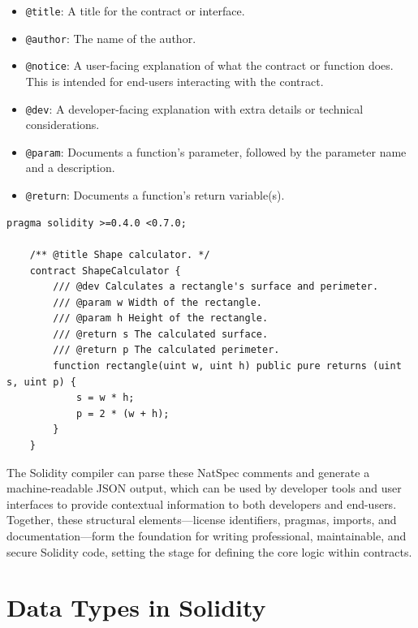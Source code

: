 \documentclass{scrbook}
\begin{document}
\begin{itemize}
    \item \texttt{@title}: A title for the contract or interface.
    
    \item \texttt{@author}: The name of the author.
    
    \item \texttt{@notice}: A user-facing explanation of what the contract or function does. This is intended for end-users interacting with the contract.
    
    \item \texttt{@dev}: A developer-facing explanation with extra details or technical considerations.
    
    \item \texttt{@param}: Documents a function's parameter, followed by the parameter name and a description.
    
    \item \texttt{@return}: Documents a function's return variable(s).
\end{itemize}

\begin{lstlisting}[caption={Example of function with comments}]
    pragma solidity >=0.4.0 <0.7.0;
    
    /** @title Shape calculator. */
    contract ShapeCalculator {
        /// @dev Calculates a rectangle's surface and perimeter.
        /// @param w Width of the rectangle.
        /// @param h Height of the rectangle.
        /// @return s The calculated surface.
        /// @return p The calculated perimeter.
        function rectangle(uint w, uint h) public pure returns (uint s, uint p) {
            s = w * h;
            p = 2 * (w + h);
        }
    }
\end{lstlisting}

The Solidity compiler can parse these NatSpec comments and generate a machine-readable JSON output, which can be used by developer tools and user interfaces to provide contextual information to both developers and end-users.\\

Together, these structural elements—license identifiers, pragmas, imports, and documentation—form the foundation for writing professional, maintainable, and secure Solidity code, setting the stage for defining the core logic within contracts.

\chapter{Data Types in Solidity}
\end{document}
